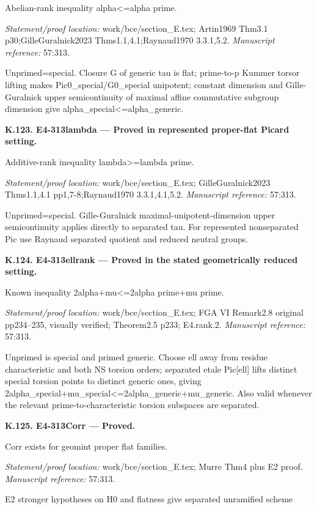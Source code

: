 Abelian-rank inequality alpha<=alpha prime.
\par\emph{Statement/proof location:} work/bce/section\_E.tex; Artin1969 Thm3.1 p30;GilleGuralnick2023 Thms1.1,4.1;Raynaud1970 3.3.1,5.2.
\emph{Manuscript reference:} 57:313.
\par Unprimed=special. Closure G of generic tau is flat; prime-to-p Kummer torsor lifting makes Pic0\_special/G0\_special unipotent; constant dimension and Gille-Guralnick upper semicontinuity of maximal affine commutative subgroup dimension give alpha\_special<=alpha\_generic.
\par\medskip\noindent\textbf{K.123. E4-313lambda --- Proved in represented proper-flat Picard setting.}\par
Additive-rank inequality lambda>=lambda prime.
\par\emph{Statement/proof location:} work/bce/section\_E.tex; GilleGuralnick2023 Thms1.1,4.1 pp1,7-8;Raynaud1970 3.3.1,4.1,5.2.
\emph{Manuscript reference:} 57:313.
\par Unprimed=special. Gille-Guralnick maximal-unipotent-dimension upper semicontinuity applies directly to separated tau. For represented nonseparated Pic use Raynaud separated quotient and reduced neutral groups.
\par\medskip\noindent\textbf{K.124. E4-313ellrank --- Proved in the stated geometrically reduced setting.}\par
Known inequality 2alpha+mu<=2alpha prime+mu prime.
\par\emph{Statement/proof location:} work/bce/section\_E.tex; FGA VI Remark2.8 original pp234–235, visually verified; Theorem2.5 p233; E4.rank.2.
\emph{Manuscript reference:} 57:313.
\par Unprimed is special and primed generic. Choose ell away from residue characteristic and both NS torsion orders; separated etale Pic[ell] lifts distinct special torsion points to distinct generic ones, giving 2alpha\_special+mu\_special<=2alpha\_generic+mu\_generic. Also valid whenever the relevant prime-to-characteristic torsion subspaces are separated.
\par\medskip\noindent\textbf{K.125. E4-313Corr --- Proved.}\par
Corr exists for geomint proper flat families.
\par\emph{Statement/proof location:} work/bce/section\_E.tex; Murre Thm4 plus E2 proof.
\emph{Manuscript reference:} 57:313.
\par E2 stronger hypotheses on H0 and flatness give separated unramified scheme
